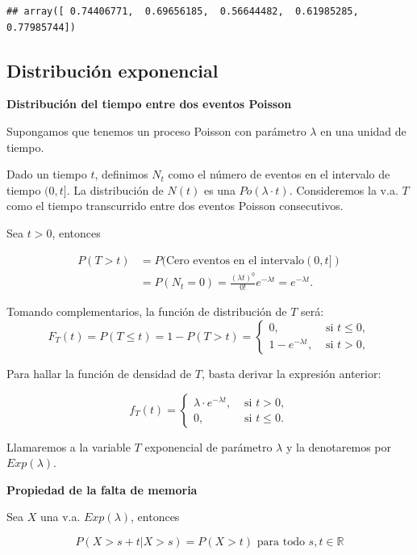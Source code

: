 \documentclass[]{book}
\begin{document}
\begin{verbatim}
## array([ 0.74406771,  0.69656185,  0.56644482,  0.61985285,  0.77985744])
\end{verbatim}

\hypertarget{distribuciuxf3n-exponencial}{%
\subsection{Distribución exponencial}\label{distribuciuxf3n-exponencial}}

\textbf{Distribución del tiempo entre dos eventos Poisson}

Supongamos que tenemos un proceso Poisson con parámetro \(\lambda\) en una unidad de tiempo.

Dado un tiempo \(t\), definimos \(N_{t}\) como el número de eventos en el intervalo de tiempo \((0,t]\). La distribución de \(N(t)\) es una \(Po(\lambda\cdot t)\). Consideremos la v.a. \(T\) como el tiempo transcurrido entre dos eventos Poisson consecutivos.

Sea \(t>0\), entonces

\[
\begin{array}{rl}
P(T>t)&=P(\mbox{Cero eventos en el intervalo}(0,t])\\
&=P(N_{t}=0)=
         \frac{(\lambda t)^0}{0!} e^{-\lambda
         t}=e^{-\lambda t}.
\end{array}
\]

Tomando complementarios, la función de distribución de \(T\) será:
\[
F_{T}(t)= P(T\leq t)=1-P(T>t)=\left\{\begin{array}{ll} 0, &\mbox{ si } t\leq 0,\\
  1-e^{-\lambda t},& \mbox{ si } t>0,\end{array}\right.
\]

Para hallar la función de densidad de \(T\), basta derivar la expresión anterior:

\[
f_{T}(t)=\left\{\begin{array}{ll}\lambda \cdot e^{-\lambda t}, & \mbox{ si }  t>0,\\
0, & \mbox{ si } t\leq 0. \end{array}\right.
\]

Llamaremos a la variable \(T\) exponencial de parámetro \(\lambda\) y la denotaremos por \(Exp(\lambda)\).

\textbf{Propiedad de la falta de memoria}

Sea \(X\) una v.a. \(Exp(\lambda)\), entonces

\[P(X>s+t\big|X>s)=P(X>t)\mbox{  para todo } s,t\in \mathbb{R}\]
\end{document}
